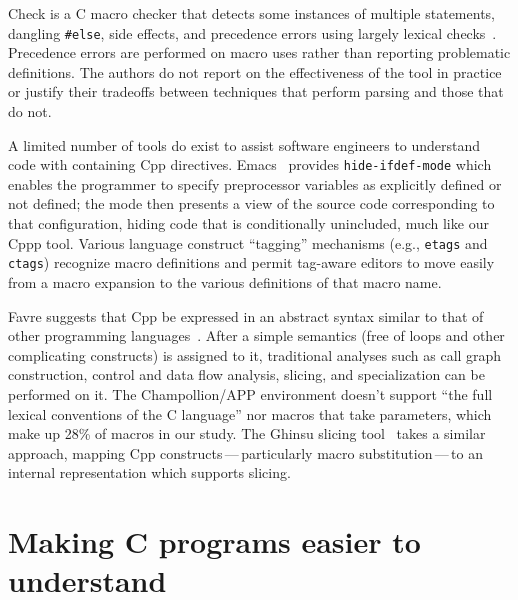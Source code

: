 \documentclass[10pt]{article}
\begin{document}

Check is a C macro checker that detects some instances of multiple
statements, dangling {\tt \#else}, side effects, and precedence errors
using largely lexical checks~\cite{SpulerS92}.  Precedence errors are
performed on macro uses rather than reporting problematic definitions.  The
authors do not report on the effectiveness of the tool in practice or
justify their tradeoffs between techniques that perform parsing and those
that do not.

A limited number of tools do exist to assist software engineers to
understand code with containing Cpp directives.  Emacs~\cite{GNUEmacs19.26}
provides \texttt{hide-ifdef-mode} which enables the programmer to specify
preprocessor variables as explicitly defined or not defined; the mode then
presents a view of the source code corresponding to that configuration,
hiding code that is conditionally unincluded, much like our Cppp tool.
Various language construct ``tagging'' mechanisms (e.g., \texttt{etags} and
\texttt{ctags}) recognize macro definitions and permit tag-aware editors
to move easily from a macro expansion to the various definitions of that
macro name.

Favre suggests that Cpp be expressed in an abstract syntax similar to that of
other programming languages~\cite{Favre96}.  After a simple semantics (free
of loops and other complicating constructs) is assigned to it, traditional
analyses such as call graph construction, control and data flow analysis,
slicing, and specialization can be performed on it.  The Champollion/APP
environment doesn't support ``the full lexical conventions of the C
language'' nor macros that take parameters, which make up 28\% of macros in
our study.
The Ghinsu slicing tool~\cite{LivadasS94} takes a similar approach, mapping
Cpp constructs\,---\,particularly macro substitution\,---\,to an internal
representation which supports slicing.




\section{Making C programs easier to understand}
\label{sec:easier-to-understand}
\end{document}
